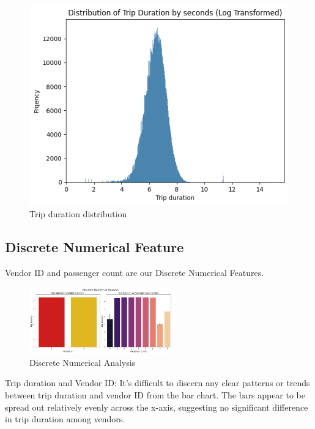 \documentclass[twocolumn, 9pt]{extarticle}
\begin{document}
\begin{figure}[ht]
\centering
    \includegraphics[width=\linewidth]{trip duration distriburion.png}
    \caption{\label{fig:trip}Trip duration distribution}
\end{figure}

\hfill \break
\subsection{Discrete Numerical Feature}

Vendor ID and passenger count are our Discrete Numerical Features.

\begin{figure}[ht]
\centering
    \includegraphics[width=0.55\textwidth, height=0.25\textheight]{Discrete Numerical Analysis.png}
    \caption{\label{Dis}Discrete Numerical Analysis}
\end{figure}

\hfill \break
Trip duration and Vendor ID: It's difficult to discern any clear patterns or trends between trip duration and vendor ID from the bar chart. The bars appear to be spread out relatively evenly across the x-axis, suggesting no significant difference in trip duration among vendors.
\end{document}
